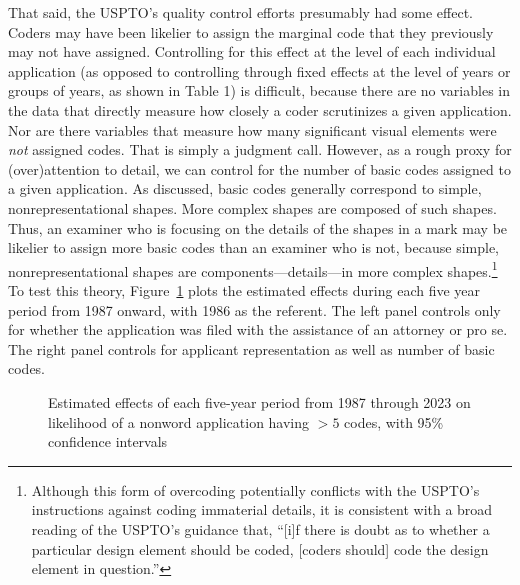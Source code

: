\documentclass[letterpaper, 11pt, oneside]{article}
\begin{document}
That said, the USPTO's quality control efforts presumably had some effect. Coders may have been likelier to assign the marginal code that they previously may not have assigned. Controlling for this effect at the level of each individual application (as opposed to controlling through fixed effects at the level of years or groups of years, as shown in Table 1) is difficult, because there are no variables in the data that directly measure how closely a coder scrutinizes a given application. Nor are there variables that measure how many significant visual elements were \textit{not} assigned codes. That is simply a judgment call. However, as a rough proxy for (over)attention to detail, we can control for the number of basic codes assigned to a given application. As discussed, basic codes generally correspond to simple, nonrepresentational shapes. More complex shapes are composed of such shapes. Thus, an examiner who is focusing on the details of the shapes in a mark may be likelier to assign more basic codes than an examiner who is not, because simple, nonrepresentational shapes are components—details—in more complex shapes.\footnote{Although this form of overcoding potentially conflicts with the USPTO's instructions against coding immaterial details, it is consistent with a broad reading of the USPTO's guidance that, ``[i]f there is doubt as to whether a particular design element should be coded, [coders should] code the design element in question.''} To test this theory, Figure~\ref{fig:8} plots the estimated effects during each five year period from 1987 onward, with 1986 as the referent. The left panel controls only for whether the application was filed with the assistance of an attorney or pro se. The right panel controls for applicant representation as well as number of basic codes.

\begin{figure}[H]
\centering

\caption{\label{fig:8} Estimated effects of each five-year period from 1987 through 2023 on likelihood of a nonword application having $> 5$ codes, with 95\% confidence intervals}
\end{figure}
\end{document}

